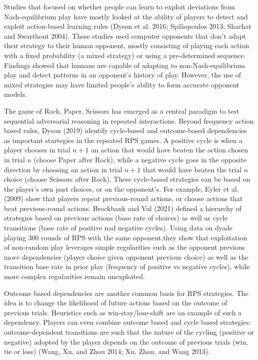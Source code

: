 \documentclass[smallextended]{svjour3}       %
\begin{document}
Studies that focused on whether people can learn to exploit deviations
from Nash-equilibrium play have mostly looked at the ability of players
to detect and exploit action-based learning rules (Dyson et al. 2016;
Spiliopoulos 2013; Shachat and Swarthout 2004). These studies used
computer opponents that don't adapt their strategy to their human
opponent, mostly consisting of playing each action with a fixed
probability (a mixed strategy) or using a pre-determined sequence.
Findings showed that humans are capable of adapting to
non-Nash-equilibrium play and detect patterns in an opponent's history
of play. However, the use of mixed strategies may have limited people's
ability to form accurate opponent models.

The game of Rock, Paper, Scissors has emerged as a central paradigm to
test sequential adversarial reasoning in repeated interactions. Beyond
frequency action based rules, Dyson (2019) identify cycle-based and
outcome-based dependencies as important startegies in the repeated RPS
games. A positive cycle is when a player chooses in trial \(n+1\) an
action that would have beaten the action chosen in trial \(n\) (choose
Paper after Rock), while a negative cycle goes in the opposite direction
by choosing an action in trial \(n+1\) that would have beaten the trial
\(n\) choice (choose Scissors after Rock). These cycle-based strategies
can be based on the player's own past choices, or on the opponent's. For
example, Eyler et al. (2009) show that players repeat previous-round
actions, or choose actions that beat previous-round actions. Brockbank
and Vul (2021) defined a hierarchy of strategies based on previous
actions (base rate of choices) as well as cycle transitions (base rate
of positive nad negative cycles). Using data on dyads playing 300 rounds
of RPS with the same opponent,they show that exploitation of non-random
play leverages simple regularities such as the opponent previous move
dependencies (player choice given opponent previous choice) as well as
the transition base rate in prior play (frequency of positive vs
negative cycles), while more complex regularities remain unexploited.

Outcome based dependencies are another common basis for RPS strategies.
The idea is to change the likelihood of future actions based on the
outcome of previous trials. Heuristics such as win-stay/lose-shift are
an example of such a dependency. Players can even combine outcome based
and cycle based strategies: outcome-dependent transitions are such that
the nature of the cycling (positive or negative) adopted by the player
depends on the outcome of previous trials (win, tie or loss) (Wang, Xu,
and Zhou 2014; Xu, Zhou, and Wang 2013).
\end{document}

